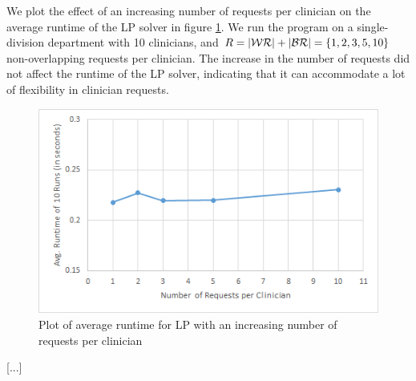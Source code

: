 We plot the effect of an increasing number of requests per clinician on the average runtime of the LP solver in figure \ref{fig:avg-runtime-requests}. We run the program on a single-division department with 10 clinicians, and $R = \abs{\mathcal{WR}} + \abs{\mathcal{BR}} = \{1, 2, 3, 5, 10\}$ non-overlapping requests per clinician. The increase in the number of requests did not affect the runtime of the LP solver, indicating that it can accommodate a lot of flexibility in clinician requests. \\

\begin{figure}[h]
	\centering
	\includegraphics[scale=.7]{fig/avg_runtime_requests}
	\caption{Plot of average runtime for LP with an increasing number of requests per clinician}
	\label{fig:avg-runtime-requests}
\end{figure}

[...]